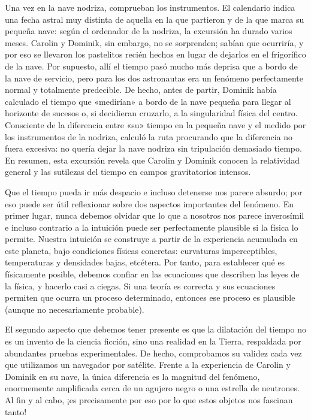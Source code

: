 Una vez en la nave nodriza, comprueban los instrumentos. El calendario indica una fecha astral muy distinta de aquella en la que partieron y de la que marca su pequeña nave: según el ordenador de la nodriza, la excursión ha durado varios meses. Carolin y Dominik, sin embargo, no se sorprenden; sabían que ocurriría, y por eso se llevaron los pastelitos recién hechos en lugar de dejarlos en el frigorífico de la nave. Por supuesto, allí el tiempo pasó mucho más deprisa que a bordo de la nave de servicio, pero para los dos astronautas era un fenómeno perfectamente normal y totalmente predecible. De hecho, antes de partir, Dominik había calculado el tiempo que «medirían» a bordo de la nave pequeña para llegar al horizonte de sucesos o, si decidieran cruzarlo, a la singularidad física del centro. Consciente de la diferencia entre «su» tiempo en la pequeña nave y el medido por los instrumentos de la nodriza, calculó la ruta procurando que la diferencia no fuera excesiva: no quería dejar la nave nodriza sin tripulación demasiado tiempo. En resumen, esta excursión revela que Carolin y Dominik conocen la relatividad general y las sutilezas del tiempo en campos gravitatorios intensos.

Que el tiempo pueda ir más despacio e incluso detenerse nos parece absurdo; por eso puede ser útil reflexionar sobre dos aspectos importantes del fenómeno. En primer lugar, nunca debemos olvidar que lo que a nosotros nos parece inverosímil e incluso contrario a la intuición puede ser perfectamente plausible si la física lo permite. Nuestra intuición se construye a partir de la experiencia acumulada en este planeta, bajo condiciones físicas concretas: curvaturas imperceptibles, temperaturas y densidades bajas, etcétera. Por tanto, para establecer qué es físicamente posible, debemos confiar en las ecuaciones que describen las leyes de la física, y hacerlo casi a ciegas. Si una teoría es correcta y sus ecuaciones permiten que ocurra un proceso determinado, entonces ese proceso es plausible (aunque no necesariamente probable).

El segundo aspecto que debemos tener presente es que la dilatación del tiempo no es un invento de la ciencia ficción, sino una realidad en la Tierra, respaldada por abundantes pruebas experimentales. De hecho, comprobamos su validez cada vez que utilizamos un navegador por satélite. Frente a la experiencia de Carolin y Dominik en su nave, la única diferencia es la magnitud del fenómeno, enormemente amplificada cerca de un agujero negro o una estrella de neutrones. Al fin y al cabo, ¡es precisamente por eso por lo que estos objetos nos fascinan tanto!

